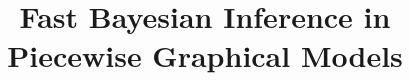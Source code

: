 \documentclass[letterpaper]{article}
\title{
Fast Bayesian Inference in Piecewise Graphical Models
}
\begin{document}
\maketitle

\begin{abstract}

\end{abstract}
















\clearpage

\end{document}

